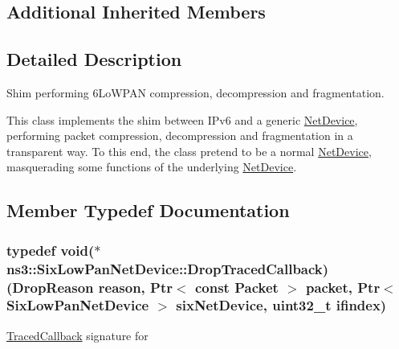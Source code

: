 \subsection*{Additional Inherited Members}


\subsection{Detailed Description}
Shim performing 6\+Lo\+W\+P\+AN compression, decompression and fragmentation. 

This class implements the shim between I\+Pv6 and a generic \hyperlink{classns3_1_1NetDevice}{Net\+Device}, performing packet compression, decompression and fragmentation in a transparent way. To this end, the class pretend to be a normal \hyperlink{classns3_1_1NetDevice}{Net\+Device}, masquerading some functions of the underlying \hyperlink{classns3_1_1NetDevice}{Net\+Device}. 

\subsection{Member Typedef Documentation}
\subsubsection[{\texorpdfstring{Drop\+Traced\+Callback}{DropTracedCallback}}]{\setlength{\rightskip}{0pt plus 5cm}typedef void($\ast$  ns3\+::\+Six\+Low\+Pan\+Net\+Device\+::\+Drop\+Traced\+Callback) ({\bf Drop\+Reason} reason, {\bf Ptr}$<$ const {\bf Packet} $>$ packet, {\bf Ptr}$<$ {\bf Six\+Low\+Pan\+Net\+Device} $>$ six\+Net\+Device, uint32\+\_\+t ifindex)}\hypertarget{classns3_1_1SixLowPanNetDevice_ac6dcccf6a63766b5d04614f72109375f}{}\label{classns3_1_1SixLowPanNetDevice_ac6dcccf6a63766b5d04614f72109375f}
\hyperlink{classns3_1_1TracedCallback}{Traced\+Callback} signature for


